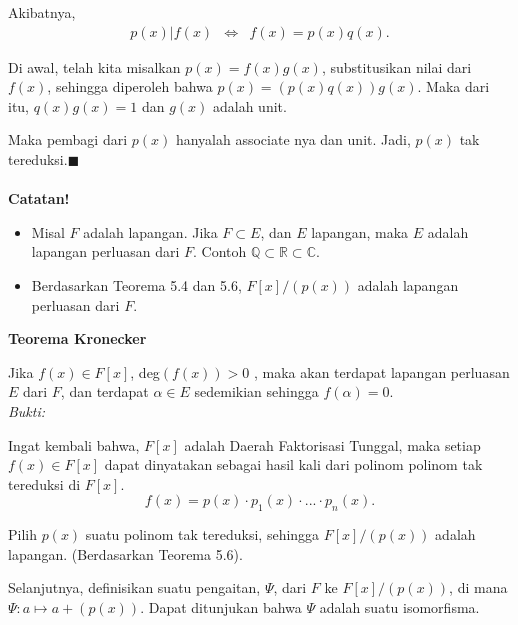 	Akibatnya,
	$$\begin{array}{rcl}
	p(x)|f(x)
	&\iff& f(x) = p(x)q(x).
	\end{array}$$
\par 	Di awal, telah kita misalkan $p(x)=f(x)g(x)$, substitusikan nilai dari $f(x)$, sehingga diperoleh bahwa $p(x) = (p(x)q(x))g(x)$. Maka dari itu, $q(x)g(x) = 1$ dan $g(x)$ adalah unit. 
\par 	Maka pembagi dari $p(x)$ hanyalah associate nya dan unit. Jadi, $p(x)$ tak tereduksi.$\blacksquare$
\\
\\
	\textbf{Catatan!}
	\begin{itemize}
	\item Misal $F$ adalah lapangan. Jika $F \subset E$, dan $E$ lapangan, maka $E$ adalah lapangan perluasan dari $F$. Contoh $\mathbb{Q} \subset \mathbb{R} \subset \mathbb{C}$.
	\item Berdasarkan Teorema 5.4 dan 5.6,  $F[x]/(p(x))$ adalah lapangan perluasan dari $F$.
	\end{itemize}
	\textbf{Teorema Kronecker}
\par 	Jika $f(x) \in F[x]$, deg$(f(x)) > 0$ , maka akan terdapat lapangan perluasan $E$ dari $F$, dan terdapat $\alpha \in E$ sedemikian sehingga $f(\alpha) =0.$
\\
	\textit{Bukti:}
\par 	Ingat kembali bahwa, $F[x]$ adalah Daerah Faktorisasi Tunggal, maka setiap $f(x)\in F[x]$ dapat dinyatakan sebagai hasil kali dari polinom polinom tak tereduksi di $F[x]$. $$f(x) = p(x)\cdot p_1(x)\cdot ... \cdot p_n(x).$$ 
\par 	Pilih $p(x)$ suatu polinom tak tereduksi, sehingga $F[x]/(p(x))$ adalah lapangan. (Berdasarkan Teorema 5.6).
\par 	Selanjutnya, definisikan suatu pengaitan, $\Psi$, dari $F$ ke $F[x]/(p(x))$, di mana $\Psi : a \mapsto a+(p(x)).$ Dapat ditunjukan bahwa $\Psi$ adalah suatu isomorfisma. 
